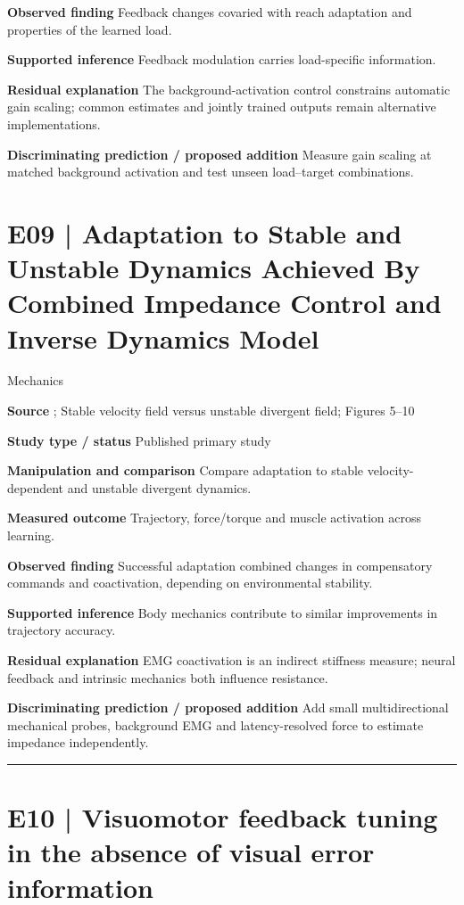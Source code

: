 \documentclass[11pt,a4paper]{article}
\begin{document}
\textbf{Observed finding} Feedback changes covaried with reach adaptation and properties of the learned load.\par
\textbf{Supported inference} Feedback modulation carries load-specific information.\par
\textbf{Residual explanation} The background-activation control constrains automatic gain scaling; common estimates and jointly trained outputs remain alternative implementations.\par
\textbf{Discriminating prediction / proposed addition} Measure gain scaling at matched background activation and test unseen load--target combinations.\par
\clearpage\section{E09 | Adaptation to Stable and Unstable Dynamics Achieved By Combined Impedance Control and Inverse Dynamics Model}
{\small\sffamily\color{navy} Mechanics}\par
\textbf{Source} \cite{franklin2003}; Stable velocity field versus unstable divergent field; Figures 5--10\par
\textbf{Study type / status} Published primary study\par
\textbf{Manipulation and comparison} Compare adaptation to stable velocity-dependent and unstable divergent dynamics.\par
\textbf{Measured outcome} Trajectory, force/torque and muscle activation across learning.\par
\textbf{Observed finding} Successful adaptation combined changes in compensatory commands and coactivation, depending on environmental stability.\par
\textbf{Supported inference} Body mechanics contribute to similar improvements in trajectory accuracy.\par
\textbf{Residual explanation} EMG coactivation is an indirect stiffness measure; neural feedback and intrinsic mechanics both influence resistance.\par
\textbf{Discriminating prediction / proposed addition} Add small multidirectional mechanical probes, background EMG and latency-resolved force to estimate impedance independently.\par
\bigskip\hrule\medskip\section{E10 | Visuomotor feedback tuning in the absence of visual error information}
\end{document}
